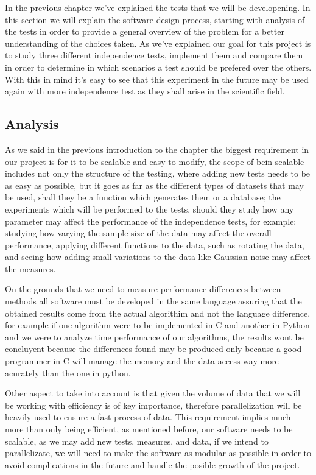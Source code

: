 In the previous chapter we've explained the tests that we will be developening. In this section we will explain the software design process, starting with analysis of the tests in order to provide a general overview of the problem for a better understanding of the choices taken.
As we've explained our goal for this project is to study three different independence tests, implement them and compare them in order to determine in which scenarios a test should be prefered over the others. With this in mind it's easy to see that this experiment in the future may be used again with more independence test as they shall arise in the scientific field.
\subsection{Analysis}

As we said in the previous introduction to the chapter the biggest requirement in our project is for it to be scalable and easy to modify, the scope of bein scalable includes not only the structure of the testing, where adding new tests needs to be as easy as possible, but it goes as far as the different types of datasets that may be used, shall they be a function which generates them or a database; the experiments which will be performed to the tests, should they study how any parameter may affect the performance of the independence tests, for example:
studying how varying the sample size of the data may affect the overall performance, applying different functions to the data, such as rotating the data, and  seeing how adding small variations to the data like Gaussian noise may affect the measures.

On the grounds that we need to measure performance differences between methods all software must be developed in the same language assuring that the obtained results come from the actual algorithim and not the language difference, for example if one algorithm were to be implemented in C and another in Python and we were to analyze time performance of our algorithms, the results wont be concluyent because the differences found may be produced only because a good programmer in C will manage the memory and the data access way more acurately than the one in python.

Other aspect to take into account is that given the volume of data that we will be working with efficiency is of key importance, therefore parallelization will be heavily used to ensure a fast process of data. This requirement implies much more than only being efficient, as mentioned before, our software needs to be scalable, as we may add new tests, measures, and data, if we intend to parallelizate, we will need to make the software as modular as possible in order to avoid complications in the future and handle the posible growth of the project.


